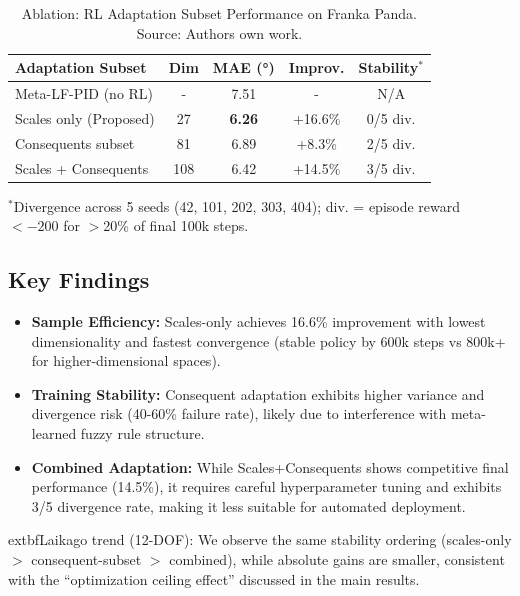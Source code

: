 \documentclass[a4paper]{cas-sc}
\begin{document}
\begin{table}[h]
\caption{Ablation: RL Adaptation Subset Performance on Franka Panda. Source: Authors own work.}
\label{tab:ablation_rl_subset}
\footnotesize
\begin{tabular}{@{}lcccc@{}}
\toprule
\textbf{Adaptation Subset} & \textbf{Dim} & \textbf{MAE (°)} & \textbf{Improv.} & \textbf{Stability$^*$} \\
\midrule
Meta-LF-PID (no RL) & - & 7.51 & - & N/A \\
\midrule
Scales only (Proposed) & 27 & \textbf{6.26} & +16.6\% & 0/5 div. \\
Consequents subset & 81 & 6.89 & +8.3\% & 2/5 div. \\
Scales + Consequents & 108 & 6.42 & +14.5\% & 3/5 div. \\
\bottomrule
\end{tabular}
\vspace{0.2cm}

\noindent \footnotesize{$^*$Divergence across 5 seeds (42, 101, 202, 303, 404); div. = episode reward $< -200$ for $>$20\% of final 100k steps.}
\end{table}

\subsection{Key Findings}

\begin{itemize}[leftmargin=*, itemsep=2pt]
    \item \textbf{Sample Efficiency:} Scales-only achieves 16.6\% improvement with lowest dimensionality and fastest convergence (stable policy by 600k steps vs 800k+ for higher-dimensional spaces).
    \item \textbf{Training Stability:} Consequent adaptation exhibits higher variance and divergence risk (40-60\% failure rate), likely due to interference with meta-learned fuzzy rule structure.
    \item \textbf{Combined Adaptation:} While Scales+Consequents shows competitive final performance (14.5\%), it requires careful hyperparameter tuning and exhibits 3/5 divergence rate, making it less suitable for automated deployment.
\end{itemize}

	extbf{Laikago trend (12-DOF):} We observe the same stability ordering (scales-only $>$ consequent-subset $>$ combined), while absolute gains are smaller, consistent with the ``optimization ceiling effect'' discussed in the main results.
\end{document}
